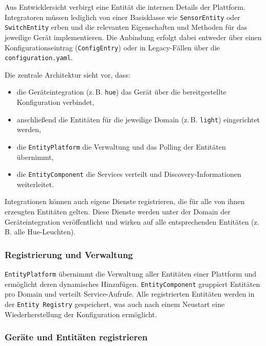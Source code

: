Aus Entwicklersicht verbirgt eine Entität die internen Details der Plattform. Integratoren müssen lediglich von einer Basisklasse wie \texttt{SensorEntity} oder \texttt{SwitchEntity} erben und die relevanten Eigenschaften und Methoden für das jeweilige Gerät implementieren. Die Anbindung erfolgt dabei entweder über einen Konfigurationseintrag (\texttt{ConfigEntry}) oder in Legacy-Fällen über die \texttt{configuration.yaml}.

Die zentrale Architektur sieht vor, dass:

\begin{itemize}
    \item die Geräteintegration (z.\,B. \texttt{hue}) das Gerät über die bereitgestellte Konfiguration verbindet,\\
    \item anschließend die Entitäten für die jeweilige Domain (z.\,B. \texttt{light}) eingerichtet werden,\\
    \item die \texttt{EntityPlatform} die Verwaltung und das Polling der Entitäten übernimmt,\\
    \item die \texttt{EntityComponent} die Services verteilt und Discovery-Informationen weiterleitet.
\end{itemize}

Integrationen können auch eigene Dienste registrieren, die für alle von ihnen erzeugten Entitäten gelten. Diese Dienste werden unter der Domain der Geräteintegration veröffentlicht und wirken auf alle entsprechenden Entitäten (z.\,B. alle Hue-Leuchten).


\subsubsection{Registrierung und Verwaltung}

\texttt{EntityPlatform} übernimmt die Verwaltung aller Entitäten einer Plattform und ermöglicht deren dynamisches Hinzufügen. \texttt{EntityComponent} gruppiert Entitäten pro Domain und verteilt Service-Aufrufe. Alle registrierten Entitäten werden in der \texttt{Entity Registry} gespeichert, was auch nach einem Neustart eine Wiederherstellung der Konfiguration ermöglicht.

\subsubsection{Geräte und Entitäten registrieren}

